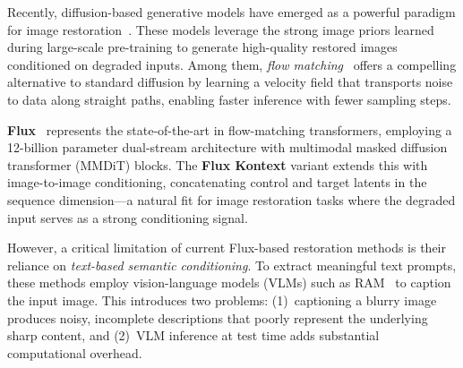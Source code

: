 \documentclass{article}
\begin{document}
Recently, diffusion-based generative models have emerged as a powerful paradigm for image restoration~\cite{saharia2022image, wang2024exploiting, wu2024osediff}. These models leverage the strong image priors learned during large-scale pre-training to generate high-quality restored images conditioned on degraded inputs. Among them, \emph{flow matching}~\cite{lipman2023flow, liu2023flow} offers a compelling alternative to standard diffusion by learning a velocity field that transports noise to data along straight paths, enabling faster inference with fewer sampling steps.

\textbf{Flux}~\cite{flux2024} represents the state-of-the-art in flow-matching transformers, employing a 12-billion parameter dual-stream architecture with multimodal masked diffusion transformer (MMDiT) blocks. The \textbf{Flux Kontext} variant extends this with image-to-image conditioning, concatenating control and target latents in the sequence dimension---a natural fit for image restoration tasks where the degraded input serves as a strong conditioning signal.

However, a critical limitation of current Flux-based restoration methods is their reliance on \emph{text-based semantic conditioning}. To extract meaningful text prompts, these methods employ vision-language models (VLMs) such as RAM~\cite{zhang2024recognize} to caption the input image. This introduces two problems: (1)~captioning a blurry image produces noisy, incomplete descriptions that poorly represent the underlying sharp content, and (2)~VLM inference at test time adds substantial computational overhead.
\end{document}
